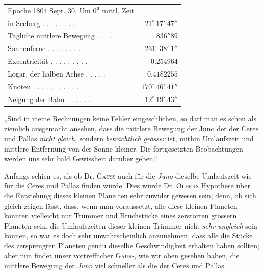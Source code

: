 \begin{center}
\begingroup\fontsize{9}{11}\selectfont\setlength{\tabcolsep}{3pt}\renewcommand{\arraystretch}{1.1}
\begin{tabular}{lr}
Epoche 1804 Sept. 30. Um $0^{\mathrm u}$ mittl. Zeit  &  \\
\quad in Seeberg . . . . . . . . . & $21^\circ\ 17'\ 47''$ \\
Tägliche mittlere Bewegung . . . . & $836''89$ \\
Sonnenferne . . . . . . . . . & $231^\circ\ 38'\ 1''$ \\
Excentricität . . . . . . . . . & $0.254964$ \\
Logar. der halben Achse . . . . . & $0.4182255$ \\
Knoten . . . . . . . . . . . & $170^\circ\ 46'\ 41''$ \\
Neigung der Bahn . . . . . . . & $12^\circ\ 19'\ 43''$ \\
\end{tabular}\endgroup
\end{center}


„Sind in meine Rechnungen keine Fehler eingeschlichen, so darf man es schon als ziemlich ausgemacht ansehen, dass die mittlere Bewegung der Juno der der Ceres
 und Pallas \emph{nicht gleich}, sondern \emph{beträchtlich grösser} ist, mithin Umlaufszeit und mittlere Entfernung von der Sonne kleiner. Die fortgesetzten Beobachtungen werden uns sehr bald Gewissheit darüber geben.“

Anfangs schien es, als ob Dr. \textsc{Gauss} auch für die \emph{Juno} dieselbe Umlaufszeit wie für die Ceres und Pallas finden würde. Dies würde Dr. \textsc{Olbers} Hypothese über die Entstehung dieses kleinen Plane%
%
ten sehr zuwider gewesen sein; denn, ob sich gleich zeigen lässt, dass, wenn man voraussetzt, alle diese
kleinen Planeten könnten vielleicht nur Trümmer und Bruchstücke eines zerstörten grössern Planeten
sein, die Umlaufszeiten dieser kleinen Trümmer nicht \emph{sehr ungleich} sein können, so war es doch sehr
unwahrscheinlich anzunehmen, dass alle die Stücke des zersprengten Planeten genau dieselbe Geschwindigkeit erhalten haben sollten; aber nun findet unser vortrefflicher \textsc{Gauss}, wie wir oben gesehen haben,
die mittlere Bewegung der \emph{Juno} viel schneller als die der Ceres und Pallas.

